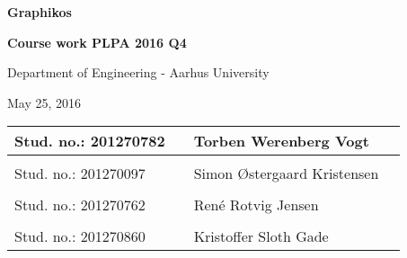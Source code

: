 
\centerline{\Huge\bfseries\color{ThemeColor} Graphikos}

\vspace{1em}
\centerline{\Large\bfseries\color{BlackColor} Course work PLPA 2016 Q4}



\vspace{5em}
\centerline{\large\bfseries\color{BlackColor}}
\centerline{\large\color{BlackColor}Department of Engineering - Aarhus University}

\vspace{0.5em}
\centerline{\large\color{BlackColor} May 25, 2016}

\vspace{25em}

\begin{center}
   \begin{tabular}{ l p{3cm} l l }
   Stud. no.: 201270782 && Torben Werenberg Vogt & \\\hline
   & & \\
   Stud. no.: 201270097 && Simon Østergaard Kristensen & \\\hline
   & & \\
   Stud. no.: 201270762 && René Rotvig Jensen & \\\hline
   & & \\
   Stud. no.: 201270860 && Kristoffer Sloth Gade & \\\hline
   \end{tabular}
\end{center}
\thispagestyle{empty} %
\restoregeometry

